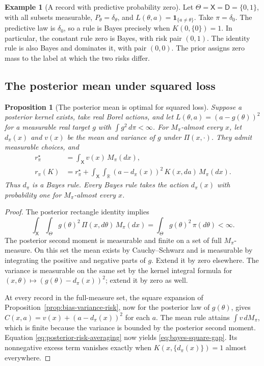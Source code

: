 \documentclass[11pt,oneside]{book}
\newtheorem{proposition}[theorem]{Proposition}
\theoremstyle{definition}
\newtheorem{example}[theorem]{Example}
\theoremstyle{remark}
\newcommand{\R}{\mathbb R}
\begin{document}
\begin{example}[A record with predictive probability zero]
\label{ex:bayes-prior-null-record}
Let $\Theta=\mathsf X=\mathsf D=\{0,1\}$, with all subsets measurable,
$P_\theta=\delta_\theta$, and $L(\theta,a)=\mathbf 1_{\{a\ne\theta\}}$.
Take $\pi=\delta_0$. The predictive law is $\delta_0$, so a rule is
Bayes precisely when $K(0,\{0\})=1$. In particular, the constant rule zero is
Bayes, with risk pair $(0,1)$. The identity rule is also Bayes and
dominates it, with pair $(0,0)$. The prior assigns zero mass to the
label at which the two risks differ.
\end{example}

\subsection{The posterior mean under squared loss}
\label{subsec:posterior-mean}

\begin{proposition}[The posterior mean is optimal for squared loss]
\label{prop:bayes-squared-mean}
Suppose a posterior kernel exists, take real Borel actions, and let
$L(\theta,a)=(a-g(\theta))^2$ for a measurable real target $g$ with
$\int g^2\,d\pi<\infty$. For $M_\pi$-almost every $x$, let $d_\pi(x)$
and $v(x)$ be the mean and variance of $g$ under $\Pi(x,\cdot)$.
They admit measurable choices, and
\begin{align}
r_\pi^\star&=\int_{\mathsf X}v(x)\,M_\pi(dx), \label{eq:bayes-value-square}\\
r_\pi(K)&=r_\pi^\star+
\int_{\mathsf X}\int_{\R}(a-d_\pi(x))^2\,K(x,da)\,M_\pi(dx).
\label{eq:bayes-square-gap}
\end{align}
Thus $d_\pi$ is a Bayes rule. Every Bayes rule takes the action
$d_\pi(x)$ with probability one for $M_\pi$-almost every $x$.
\end{proposition}
\begin{proof}
The posterior rectangle identity implies
\[
\int_{\mathsf X}\int_\Theta g(\theta)^2\,\Pi(x,d\theta)\,M_\pi(dx)
=\int_\Theta g(\theta)^2\,\pi(d\theta)<\infty.
\]
The posterior second moment is measurable and finite on a set of full
$M_\pi$-measure. On this set the mean exists by Cauchy--Schwarz and is
measurable by integrating the positive and negative parts of $g$. Extend
it by zero elsewhere. The variance is measurable on the same set by the
kernel integral formula for $(x,\theta)\mapsto(g(\theta)-d_\pi(x))^2$;
extend it by zero as well.

At every record in the full-measure set, the square expansion of
Proposition~\ref{prop:bias-variance-risk}, now for the posterior law of
$g(\theta)$, gives $C(x,a)=v(x)+(a-d_\pi(x))^2$ for each $a$.
The mean rule attains $\int v\,dM_\pi$, which is finite because the
variance is bounded by the posterior second moment. Equation
\eqref{eq:posterior-risk-averaging} now yields
\eqref{eq:bayes-square-gap}. Its nonnegative excess term vanishes exactly
when $K(x,\{d_\pi(x)\})=1$ almost everywhere.
\end{proof}
\end{document}
